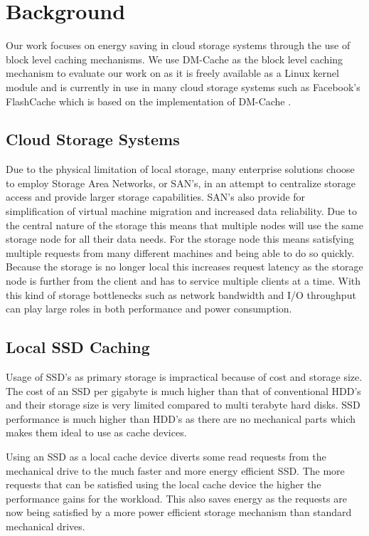 \section{Background}

Our work focuses on energy saving in cloud storage systems through the use of
block level caching mechanisms. We use DM-Cache as the block level caching
mechanism to evaluate our work on as it is freely available as a Linux kernel
module and is currently in use in many cloud storage systems such as Facebook's
FlashCache which is based on the implementation of DM-Cache \cite{flashcache}.

\subsection{Cloud Storage Systems}

Due to the physical limitation of local storage, many enterprise solutions
choose to employ Storage Area Networks, or SAN's, in an attempt to centralize
storage access and provide larger storage capabilities. SAN's also provide for
simplification of virtual machine migration and increased data reliability. Due
to the central nature of the storage this means that multiple nodes will use the
same storage node for all their data needs. For the storage node this means
satisfying multiple requests from many different machines and being able to do
so quickly. Because the storage is no longer local this increases request
latency as the storage node is further from the client and has to service
multiple clients at a time. With this kind of storage bottlenecks such as
network bandwidth and I/O throughput can play large roles in both performance
and power consumption.

\subsection{Local SSD Caching}

Usage of SSD's as primary storage is impractical because of cost and storage
size. The cost of an SSD per gigabyte is much higher than that of conventional
HDD's and their storage size is very limited compared to multi terabyte hard
disks. SSD performance is much higher than HDD's as there are no mechanical
parts which makes them ideal to use as cache devices.

Using an SSD as a local cache device diverts some read requests from the
mechanical drive to the much faster and more energy efficient SSD. The more
requests that can be satisfied using the local cache device the higher the
performance gains for the workload. This also saves energy as the requests are
now being satisfied by a more power efficient storage mechanism than standard
mechanical drives.

